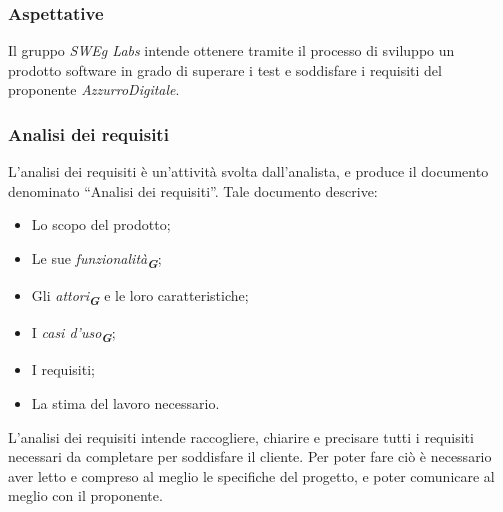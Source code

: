 \subsubsection{Aspettative}
Il gruppo \emph{SWEg Labs} intende ottenere tramite il processo di sviluppo un prodotto software in grado di superare i test e soddisfare i requisiti del proponente \emph{AzzurroDigitale}.

\subsubsection{Analisi dei requisiti}

L’analisi dei requisiti è un’attività svolta dall’analista, e produce il documento denominato “Analisi dei requisiti”. 
Tale documento descrive:
\begin{itemize}
    \item Lo scopo del prodotto;
    \item Le sue \emph{funzionalità}\textsubscript{\textit{\textbf{G}}};
    \item Gli \emph{attori}\textsubscript{\textit{\textbf{G}}} e le loro caratteristiche;
    \item I \emph{casi d'uso}\textsubscript{\textit{\textbf{G}}};
    \item I requisiti;
    \item La stima del lavoro necessario.
\end{itemize}

L’analisi dei requisiti intende raccogliere, chiarire e precisare tutti i requisiti necessari da completare per soddisfare il cliente. Per poter fare ciò è necessario aver letto e compreso al meglio le specifiche del progetto, e poter comunicare al meglio con il proponente.

